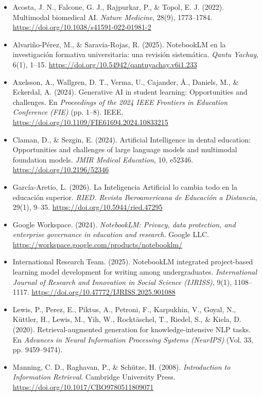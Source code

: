 \begin{itemize}[leftmargin=1.5em, label={}, itemsep=0.22ex, parsep=0pt]
\small\raggedright
{}
\emergencystretch=1.5em
    \item Acosta, J. N., Falcone, G. J., Rajpurkar, P., \& Topol, E. J. (2022). Multimodal biomedical AI. \textit{Nature Medicine}, 28(9), 1773--1784. \url{https://doi.org/10.1038/s41591-022-01981-2}
    \item Alvariño-Pérez, M., \& Saravia-Rojas, R. (2025). NotebookLM en la investigación formativa universitaria: una revisión sistemática. \textit{Qantu Yachay}, 6(1), 1--15. \url{https://doi.org/10.54942/qantuyachay.v6i1.233}
    \item Axelsson, A., Wallgren, D. T., Verma, U., Cajander, \AA., Daniels, M., \& Eckerdal, A. (2024). Generative AI in student learning: Opportunities and challenges. En \textit{Proceedings of the 2024 IEEE Frontiers in Education Conference (FIE)} (pp. 1--8). IEEE. \url{https://doi.org/10.1109/FIE61694.2024.10833215}
    \item Claman, D., \& Sezgin, E. (2024). Artificial Intelligence in dental education: Opportunities and challenges of large language models and multimodal foundation models. \textit{JMIR Medical Education}, 10, e52346. \url{https://doi.org/10.2196/52346}
    \item García-Aretio, L. (2026). La Inteligencia Artificial lo cambia todo en la educación superior. \textit{RIED. Revista Iberoamericana de Educación a Distancia}, 29(1), 9--35. \url{https://doi.org/10.5944/ried.47295}
    \item Google Workspace. (2024). \textit{NotebookLM: Privacy, data protection, and enterprise governance in education and research}. Google LLC. \url{https://workspace.google.com/products/notebooklm/}
    \item International Research Team. (2025). NotebookLM integrated project-based learning model development for writing among undergraduates. \textit{International Journal of Research and Innovation in Social Science (IJRISS)}, 9(1), 1108--1117. \url{https://doi.org/10.47772/IJRISS.2025.901088}
    \item Lewis, P., Perez, E., Piktus, A., Petroni, F., Karpukhin, V., Goyal, N., K\"{u}ttler, H., Lewis, M., Yih, W., Rockt\"{a}schel, T., Riedel, S., \& Kiela, D. (2020). Retrieval-augmented generation for knowledge-intensive NLP tasks. En \textit{Advances in Neural Information Processing Systems (NeurIPS)} (Vol. 33, pp. 9459--9474).
    \item Manning, C. D., Raghavan, P., \& Sch\"{u}tze, H. (2008). \textit{Introduction to Information Retrieval}. Cambridge University Press. \url{https://doi.org/10.1017/CBO9780511809071}

\end{itemize}
